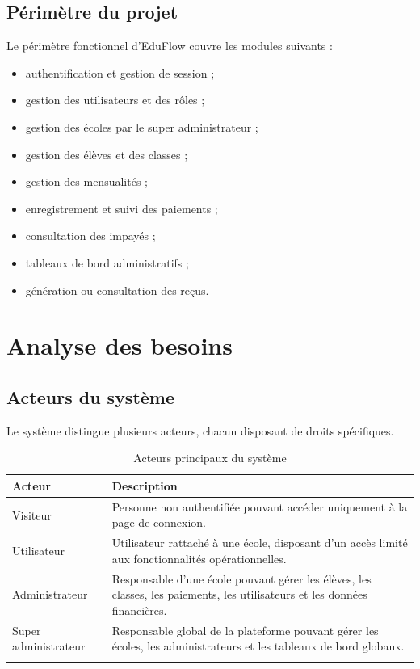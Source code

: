 \documentclass[12pt,a4paper]{report}
\begin{document}
\section{Périmètre du projet}

Le périmètre fonctionnel d'EduFlow couvre les modules suivants :

\begin{itemize}[label=--]
    \item authentification et gestion de session ;
    \item gestion des utilisateurs et des rôles ;
    \item gestion des écoles par le super administrateur ;
    \item gestion des élèves et des classes ;
    \item gestion des mensualités ;
    \item enregistrement et suivi des paiements ;
    \item consultation des impayés ;
    \item tableaux de bord administratifs ;
    \item génération ou consultation des reçus.
\end{itemize}

\chapter{Analyse des besoins}

\section{Acteurs du système}

Le système distingue plusieurs acteurs, chacun disposant de droits spécifiques.

\begin{longtable}{|p{4cm}|p{10cm}|}
\hline
\textbf{Acteur} & \textbf{Description} \\
\hline
Visiteur & Personne non authentifiée pouvant accéder uniquement à la page de connexion. \\
\hline
Utilisateur & Utilisateur rattaché à une école, disposant d'un accès limité aux fonctionnalités opérationnelles. \\
\hline
Administrateur & Responsable d'une école pouvant gérer les élèves, les classes, les paiements, les utilisateurs et les données financières. \\
\hline
Super administrateur & Responsable global de la plateforme pouvant gérer les écoles, les administrateurs et les tableaux de bord globaux. \\
\hline
\caption{Acteurs principaux du système}
\end{longtable}
\end{document}
